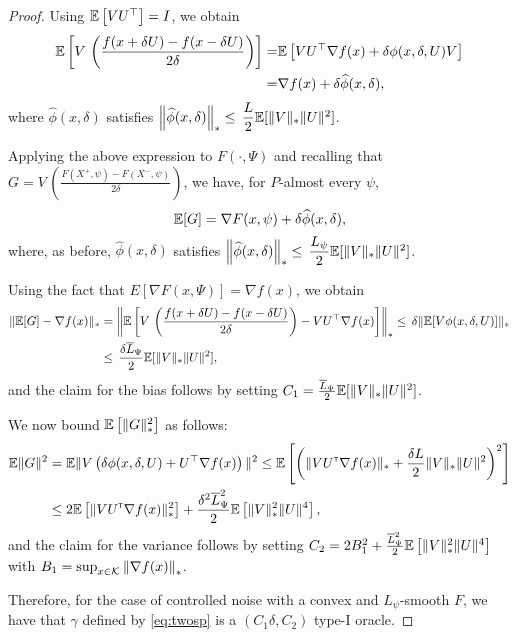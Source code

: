 \begin{proof}
Using $\mathbb{E}\left[V U^\top\right]=I$, we obtain
\begin{align*}
\mathbb{E}\left[V\,  \left(\frac{f(x+\delta U)  -f(x-\delta U)}{2\delta}\right)\right]=&
\mathbb{E}\left[ V U^\top\nabla f(x) +  \delta\phi(x,\delta,U) V \right]\\
= &  \nabla f(x) + \delta \widehat\phi(x,\delta),
\end{align*}
where $\widehat\phi(x,\delta)$ satisfies $\left\|\widehat\phi(x,\delta)\right\|_*  \le \, \dfrac{L}{2}\mathbb{E}[ \|V\|_* \|U\|^2]$.

Applying the above expression to $F(\cdot, \Psi)$ and recalling that $G=V\,  \left(\tfrac{F(X^+,\psi)  -F(X^-,\psi)}{2\delta}\right)$, we have, for $P$-almost every $\psi$, 
$$\mathbb{E}[G] = \nabla F(x,\psi) + \delta \widehat\phi(x,\delta),$$
where, as before, $\widehat\phi(x,\delta)$ satisfies $\left\|\widehat\phi(x,\delta)\right\|_*  \le \, \dfrac{L_{\psi}}{2}\mathbb{E}[ \|V\|_* \|U\|^2]$.

Using the fact that $E[\nabla F(x,\Psi)] = \nabla f(x)$, we obtain
\begin{align*}
 \|\mathbb{E}[G] - \nabla f(x)\|_*
 &= \left\|\mathbb{E}\left[V\,  \left(\frac{f(x+\delta U)  -f(x-\delta U)}{2\delta}\right)-V U^\top\nabla f(x) \right]\right\|_*
 \le \, \delta \|\mathbb{E}[ V \phi(x,\delta, U)]\|_*\\
 &\le \,\frac{\delta \overline{L}_{\Psi}}{2} \mathbb{E}[ \|V\|_* \|U\|^2],
\end{align*}
and the claim for the bias follows by setting $C_1= \frac{\overline{L}_{\Psi}}{2} \mathbb{E}[ \|V\|_* \|U\|^2]$.

We now bound $\mathbb{E}\left[ \|G\|_*^2\right]$ as follows:
\begin{align*}
 \mathbb{E} \|G\|^2
& = \mathbb{E}\|V\left(\delta \phi(x,\delta, U)+ U^\top\nabla f(x) \right)\|^2
 \le  \mathbb{E}\left[ \left( \| V U ^\mathsf{\scriptscriptstyle T} \nabla f(x)\|_* + \frac{\delta L}{2} \|V\|_* \|U\|^2 \right)^2\right]\\
& \le  2 \mathbb{E}\left[  \| V U ^\mathsf{\scriptscriptstyle T} \nabla f(x)\|_*^2\right]  + \frac{\delta^2 \overline{L}_{\Psi}^2}{2}\mathbb{E}\left[ \|V\|_*^2 \|U\|^4 \right],
\end{align*}
and the claim for the variance follows by setting $C_2 =  2 B_1^2  + \frac{ \overline{L}_{\Psi}^2}{2}\mathbb{E}\left[ \|V\|_*^2 \|U\|^4 \right]$ with $B_1 = \sup_{x\in \mathcal{K}} \left\|\nabla f(x)\right\|_*$.

Therefore, for the case of controlled noise with a convex and $L_{\psi}$-smooth $F$, we have that $\gamma$ defined by \eqref{eq:twosp} is a $(C_1\delta, C_2)$ type-I oracle.  
\end{proof}



